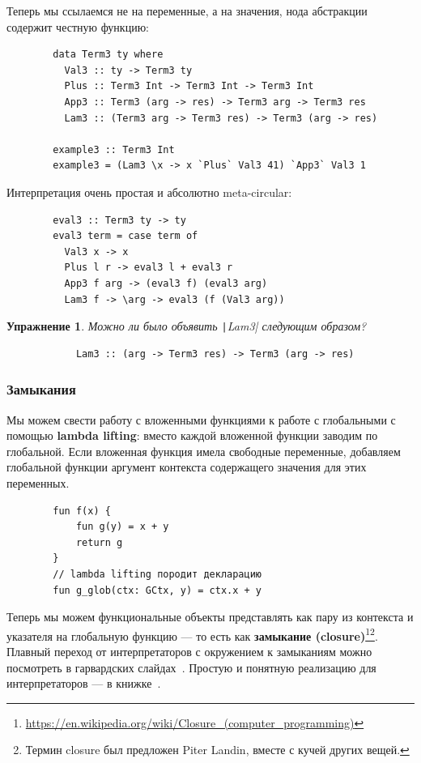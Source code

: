 \documentclass[12pt]{article}
\newcommand{\vocab}[1]{\textbf{#1}} %
\newtheorem{task}{Упражнение}
\begin{document}
    Теперь мы ссылаемся не на переменные, а на значения, нода абстракции содержит честную функцию:
    \begin{verbatim}
        data Term3 ty where
          Val3 :: ty -> Term3 ty
          Plus :: Term3 Int -> Term3 Int -> Term3 Int
          App3 :: Term3 (arg -> res) -> Term3 arg -> Term3 res
          Lam3 :: (Term3 arg -> Term3 res) -> Term3 (arg -> res)

        example3 :: Term3 Int
        example3 = (Lam3 \x -> x `Plus` Val3 41) `App3` Val3 1
    \end{verbatim}

    Интерпретация очень простая и абсолютно meta-circular:
    \begin{verbatim}
        eval3 :: Term3 ty -> ty
        eval3 term = case term of
          Val3 x -> x
          Plus l r -> eval3 l + eval3 r
          App3 f arg -> (eval3 f) (eval3 arg)
          Lam3 f -> \arg -> eval3 (f (Val3 arg))
    \end{verbatim}

    \begin{task}
        Можно ли было объявить \texttt|Lam3| следующим образом?
        \begin{verbatim}
            Lam3 :: (arg -> Term3 res) -> Term3 (arg -> res)
        \end{verbatim}
    \end{task}

    \subsubsection{Замыкания} \label{subsubsec:closures}

    Мы можем свести работу с вложенными функциями к работе с глобальными с помощью \vocab{lambda lifting}: вместо каждой вложенной функции заводим по глобальной.
    Если вложенная функция имела свободные переменные, добавляем глобальной функции аргумент контекста содержащего значения для этих переменных.
    \begin{verbatim}
        fun f(x) {
            fun g(y) = x + y
            return g
        }
        // lambda lifting породит декларацию
        fun g_glob(ctx: GCtx, y) = ctx.x + y
    \end{verbatim}

    Теперь мы можем функциональные объекты представлять как пару из контекста и указателя на глобальную функцию --- то есть как \vocab{замыкание (closure)}\footnote{\url{https://en.wikipedia.org/wiki/Closure_(computer_programming)}}\footnote{Термин closure был предложен Piter Landin, вместе с кучей других вещей.}.
    Плавный переход от интерпретаторов с окружением к замыканиям можно посмотреть в гарвардских слайдах~\cite{closures-slides}.
    Простую и понятную реализацию для интерпретаторов --- в книжке~\cite[глава 11]{nystrom2021crafting}.
\end{document}
